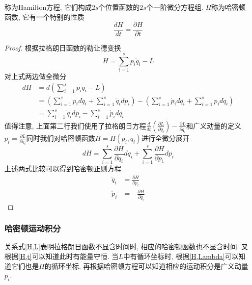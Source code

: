 \documentclass[a4paper,11pt]{book}
\newtheorem{proof}{证明}[section]
\begin{document}
称为Hamilton方程, 它们构成$2s$个位置函数的$2s$个一阶微分方程组. $H$称为哈密顿函数, 它有一个特别的性质
\begin{equation*}
  \frac{dH}{dt}=\frac{\partial H}{\partial t}
\end{equation*}
\begin{proof}
  根据拉格朗日函数的勒让德变换
  \begin{equation*}
    H=\sum_{i=1}^{s}p_i\dot{q}_i-L
  \end{equation*}
  对上式两边做全微分
  \begin{equation*}
    \begin{split}
       dH&=d\left(\sum_{i=1}^{s}p_i\dot{q}_i-L\right) \\
         &=\left(\sum_{i=1}^{s}p_id\dot{q}_i+\sum_{i=1}^{s}\dot{q}_idp_i\right)-\left(\sum_{i=1}^{s}\dot{p}_idq_i+\sum_{i=1}^{s}p_id\dot{q}_i\right)\\
         &=\sum_{i=1}^{s}\dot{q}_idp_i-\sum_{i=1}^{s}\dot{p}_idq_i
    \end{split}
  \end{equation*}
  值得注意, 上面第二行我们使用了拉格朗日方程$\frac{d}{dt}\left(\frac{\partial L}{\partial{\dot{q}_i}}\right)-\frac{\partial L}{\partial{q_i}}$和广义动量的定义$p_i=\frac{\partial L}{\partial{q}_i}$同时我们对哈密顿函数$H=H(p_i,q_i)$进行全微分展开
  \begin{equation*}
    dH=\sum_{i=1}^{s}\frac{\partial H}{\partial{q_i}}dq_i+\sum_{i=1}^{s}\frac{\partial H}{\partial{p_1}}dp_i
  \end{equation*}
  上述两式比较可以得到哈密顿正则方程
  \begin{equation*}
  \begin{split}
     \dot{q}_i&=\frac{\partial H}{\partial{p_i}} \\
     \dot{p}_i&=-\frac{\partial H}{\partial{q_i}}
  \end{split}
  \end{equation*}
\end{proof}
\subsubsection*{哈密顿运动积分}
关系式\eqref{H,L}表明拉格朗日函数不显含时间时, 相应的哈密顿函数也不显含时间. 又根据\eqref{H,t}可以知道此时有能量守恒. 当$L$中有循环坐标时, 根据\eqref{H,Lambda}可以知道它们也是$H$的循环坐标. 再根据哈密顿方程可以知道相应的运动积分是广义动量$p_i$.
\end{document}
